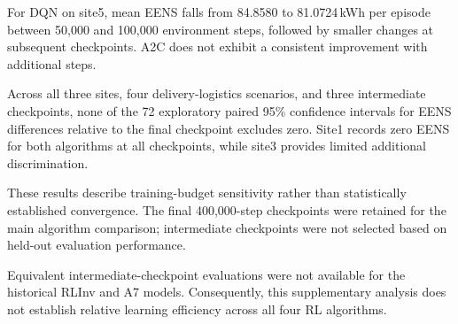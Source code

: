 \begin{revisedblock}
For DQN on site5, mean EENS falls from
84.8580 to 81.0724\,kWh per episode between
50,000 and 100,000 environment steps, followed
by smaller changes at subsequent checkpoints.
A2C does not exhibit a consistent improvement
with additional steps.

Across all three sites, four delivery-logistics
scenarios, and three intermediate checkpoints,
none of the 72 exploratory paired 95\% confidence
intervals for EENS differences relative to the final
checkpoint excludes zero. Site1 records zero
EENS for both algorithms at all checkpoints,
while site3 provides limited additional
discrimination.

These results describe training-budget sensitivity
rather than statistically established convergence.
The final 400,000-step checkpoints were
retained for the main algorithm comparison;
intermediate checkpoints were not selected based
on held-out evaluation performance.

Equivalent intermediate-checkpoint evaluations
were not available for the historical RLInv and A7
models. Consequently, this supplementary analysis
does not establish relative learning efficiency
across all four RL algorithms.
\end{revisedblock}